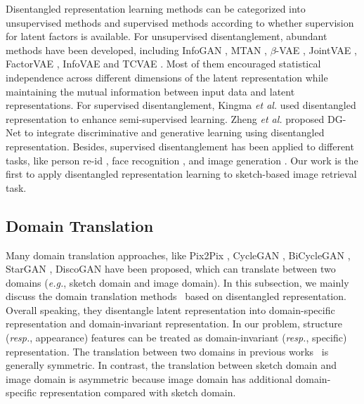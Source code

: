 \documentclass[10pt,twocolumn,letterpaper]{article}
\begin{document}
Disentangled representation learning methods can be categorized into unsupervised methods and supervised methods according to whether supervision for latent factors is available.
For unsupervised disentanglement, abundant methods have been developed, including InfoGAN \cite{chen2016infogan}, MTAN \cite{liu2018multi}, $\beta$-VAE \cite{higgins2017beta}, JointVAE \cite{dupont2018learning}, FactorVAE \cite{kim2018disentangling}, InfoVAE \cite{zhao2017infovae} and TCVAE \cite{chen2018isolating}. 
Most of them encouraged statistical independence across different dimensions of the latent representation while maintaining the mutual information between input data and latent representations.
For supervised disentanglement, Kingma \textit{et al.}  \cite{kingma2014semi} used disentangled representation to enhance semi-supervised learning. Zheng \textit{et al.} \cite{zheng2019joint} proposed DG-Net to integrate discriminative and generative learning using disentangled representation. Besides, supervised disentanglement has been applied to different tasks, like person re-id \cite{zheng2019joint}, face recognition \cite{liu2018unified, liu2018exploring, shu2017neural, tran2017disentangled}, and image generation \cite{ma2018disentangled, yan2016attribute2image, mathieu2016disentangling, jha2018disentangling}. Our work is the first to apply disentangled representation learning to sketch-based image retrieval task. 

\subsection{Domain Translation}
Many domain translation approaches, like Pix2Pix \cite{pix2pix2017}, CycleGAN \cite{zhu2017unpaired}, BiCycleGAN \cite{zhu2017toward}, StarGAN \cite{StarGAN2018}, DiscoGAN \cite{kim2017learning} have been proposed, which can translate between two domains (\emph{e.g.}, sketch domain and image domain).
In this subsection, we mainly discuss the domain translation methods~\cite{lee2018diverse,lee2019drit,huang2018multimodal,gonzalez2018image} based on disentangled representation. 
Overall speaking, they disentangle latent representation into domain-specific representation and domain-invariant representation. In our problem, structure (\emph{resp.}, appearance) features can be treated as domain-invariant (\emph{resp.}, specific) representation. The translation between two domains in previous works~\cite{lee2018diverse,lee2019drit,huang2018multimodal,gonzalez2018image} is generally symmetric. In contrast, the translation between sketch domain and image domain  is asymmetric because image domain has additional domain-specific representation compared with sketch domain.
\end{document}
